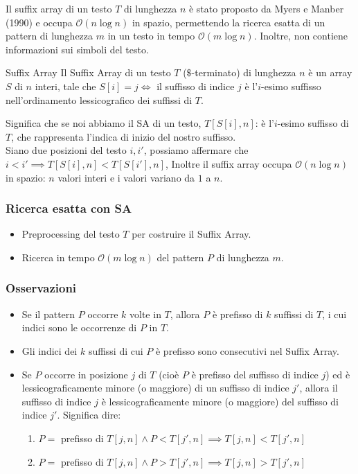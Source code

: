 Il suffix array di un testo $T$ di lunghezza $n$ è stato proposto da Myers e Manber (1990) e occupa $\mathcal{O} (n \log n)$ in spazio, permettendo la ricerca esatta di un pattern di lunghezza $m$ in un testo in tempo $\mathcal{O}(m \log n)$.
Inoltre, non contiene informazioni sui simboli del testo.

\begin{teorema}{Suffix Array}{}
Il Suffix Array di un testo $T$ ($\$$-terminato) di lunghezza $n$ è un array $S$ di $n$ interi, tale che $S[i] = j \iff $ il suffisso di indice $j$ è l’$i$-esimo suffisso nell’ordinamento lessicografico dei suffissi di $T$.
\end{teorema}

Significa che se noi abbiamo il SA di un testo, $T[S[i], n]$: è l'$i$-esimo suffisso di $T$, che rappresenta l'indica di inizio del nostro suffisso. \\
Siano due posizioni del testo $i,i'$, possiamo affermare che $i < i' \implies T[S[i], n] < T[S[i'], n]$, Inoltre il suffix array occupa $\mathcal{O}(n \log n)$ in spazio: $n$ valori interi e i valori variano da $1$ a $n$.

\subsubsection{Ricerca esatta con SA}
\begin{itemize}
    \item Preprocessing del testo $T$ per costruire il Suffix Array.
    \item Ricerca in tempo $\mathcal{O}(m \log n)$ del pattern $P$ di lunghezza $m$.
\end{itemize}
\subsubsection{Osservazioni}
\begin{itemize}
    \item Se il pattern $P$ occorre $k$ volte in $T$, allora $P$ è prefisso di $k$ suffissi di $T$, i cui indici sono le occorrenze di $P$ in $T$.
    \item Gli indici dei $k$ suffissi di cui $P$ è prefisso sono consecutivi nel Suffix Array.
    \item Se $P$ occorre in posizione $j$ di $T$ (cioè $P$ è prefisso del suffisso di indice $j$) ed è lessicograficamente minore (o maggiore) di un suffisso di indice $j'$, allora il suffisso di indice $j$ è lessicograficamente minore (o maggiore) del suffisso di indice $j'$. Significa dire:
    \begin{enumerate}
        \item $P = $ prefisso di $T[j, n] \land P < T[j', n] \implies T[j, n] < T[j', n]$
        \item $P = $ prefisso di $T[j, n] \land P > T[j', n] \implies T[j, n] > T[j', n]$ 
    \end{enumerate}
\end{itemize}

